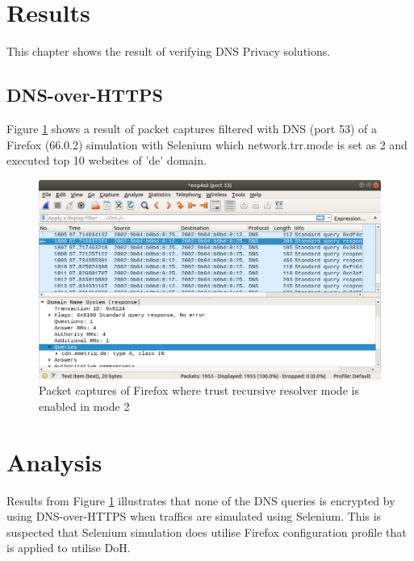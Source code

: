 \documentclass[a4paper,12pt]{article}
\begin{document}
\section{Results}
This chapter shows the result of verifying DNS Privacy solutions.
\subsection{DNS-over-HTTPS}
Figure \ref{selenium-mode2packets} shows a result of packet captures filtered with DNS (port 53) of a Firefox (66.0.2) simulation with Selenium which network.trr.mode is set as 2 and executed top 10 websites of 'de' domain.

\begin{figure}[h!]
    \begin{center}
    \includegraphics*[width=0.9\columnwidth]{img/selenium-firefox-mode2/wireshark}
    \end{center}
    \caption{Packet captures of Firefox where trust recursive resolver mode is enabled in mode 2}
    \label{selenium-mode2packets}
\end{figure}



\newpage

\section{Analysis}
Results from Figure \ref{selenium-mode2packets} illustrates that none of the DNS queries is encrypted by using DNS-over-HTTPS when traffics are simulated using Selenium. This is suspected that Selenium simulation does utilise Firefox configuration profile that is applied to utilise DoH.
\end{document}
